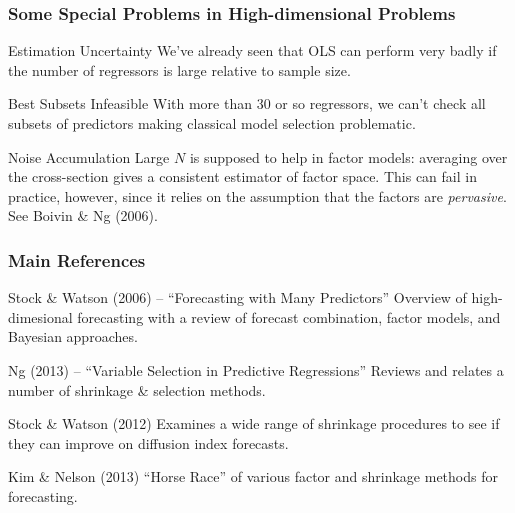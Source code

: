 \documentclass[handout]{beamer}
\begin{document}
\begin{frame}[c]\frametitle{Some Special Problems in High-dimensional Problems}
    

\begin{block}
	{Estimation Uncertainty} 
	We've already seen that OLS can perform very badly if the number of regressors is large relative to sample size.
\end{block}

\begin{block}
	{Best Subsets Infeasible}
	With more than 30 or so regressors, we can't check all subsets of predictors making classical model selection problematic.
\end{block}

\begin{block}
	{Noise Accumulation} 
	Large $N$ is supposed to help in factor models: averaging over the cross-section gives a consistent estimator of factor space. This can fail in practice, however, since it relies on the assumption that the factors are \emph{pervasive}. See Boivin \& Ng (2006).
\end{block}


\end{frame}
\begin{frame}
	\frametitle{Main References}
	\begin{block}
		{Stock \& Watson (2006) -- ``Forecasting with Many Predictors''} Overview of high-dimesional forecasting with a review of forecast combination, factor models, and Bayesian approaches.
	\end{block}
	\begin{block}
		{Ng (2013) -- ``Variable Selection in Predictive Regressions''}
		Reviews and relates a number of shrinkage \& selection methods.
	\end{block}
	\begin{block}
		{Stock \& Watson (2012)}
		Examines a wide range of shrinkage procedures to see if they can improve on diffusion index forecasts.
	\end{block}
	\begin{block}
		{Kim \& Nelson (2013)}
		``Horse Race'' of various factor and shrinkage methods for forecasting.
	\end{block}
\end{frame}
\end{document}
